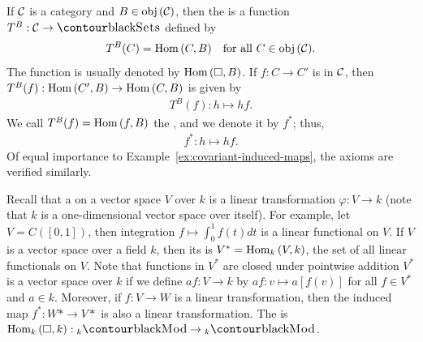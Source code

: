     \begin{example}\label{ex:contravariant-induced-maps}
        If $\mathcal{C}$ is a category and $B \in \operatorname{obj}{(\mathcal{C})}$, then the  is a function $T^B:\mC \rightarrow \cSets$ defined by
            \begin{equation*}
            \begin{split}
                T^B(C) = \operatorname{Hom}{(C,B)}\quad \text{for all $C \in \operatorname{obj}{(\mathcal{C})}$}.
            \end{split}
            \end{equation*}
        The function is usually denoted by $\operatorname{Hom}{(\square,B)}$. If $f: C \rightarrow C'$ is in $\mathcal{C}$, then $T^B(f):\operatorname{Hom}{(C',B)} \rightarrow \operatorname{Hom}{(C,B)}$ is given by
            \begin{equation*}
            \begin{split}
                T^B(f):h \mapsto hf.
            \end{split}
            \end{equation*}
        We call $T^B(f)=\operatorname{Hom}{(f,B)}$ the , and we denote it by $f^*$; thus,
            \begin{equation*}
            \begin{split}
                f^* : h \mapsto hf.
            \end{split}
            \end{equation*}
        Of equal importance to Example~\ref{ex:covariant-induced-maps}, the axioms are verified similarly.
    \end{example}

    \begin{example}
        Recall that a  on a vector space $V$ over $k$ is a linear transformation $\varphi:V \rightarrow k$ (note that $k$ is a one-dimensional vector space over itself). For example, let $V = C([0,1])$, then integration $f \mapsto \int_{0}^{1}f(t)dt$ is a linear functional on $V$. If $V$ is a vector space over a field $k$, then its  is $V^* = \operatorname{Hom}_k{(V,k)}$, the set of all linear functionals on $V$. Note that functions in $V^*$ are closed under pointwise addition \textemdash  $V^*$ is a vector space over $k$ if we define $af: V \rightarrow k$ by $af: v \mapsto a[f(v)]$ for all $f \in V^* $ and $ a \in k$. Moreover, if $f: V \rightarrow W$ is a linear transformation, then the induced map $f^*: W* \rightarrow V*$ is also a linear transformation. The  is $\Hom_k{(\square,k)}: {}_{k}\cMod \rightarrow {}_{k}\cMod$.
    \end{example}

